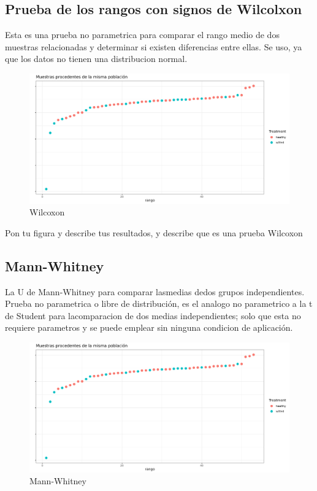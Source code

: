 \subsection{Prueba de los rangos con signos de Wilcolxon}

Esta es una prueba no parametrica para comparar el rango medio de dos muestras relacionadas y determinar si existen diferencias entre ellas. Se uso, ya que los datos no tienen una distribucion normal.

\begin{figure}[!]
\centering
\includegraphics[width=\textwidth]{Img/cap2/Wilcoxon_Shannon.png}
\caption{Wilcoxon}
\end{figure}




Pon tu figura y describe tus resultados, y describe que es una prueba Wilcoxon


\subsection{Mann-Whitney}
La U de Mann-Whitney para comparar lasmedias dedos grupos independientes. 
Prueba no parametrica o libre de distribución, es el analogo no parametrico a la t de Student para lacomparacion de dos medias independientes; solo que esta no requiere parametros y se puede emplear sin ninguna condicion de aplicación.

\begin{figure}[!]
\centering
\includegraphics[width=\textwidth]{Img/cap2/Wilcoxon_Shannon.png}
\caption{Mann-Whitney}
\end{figure}



